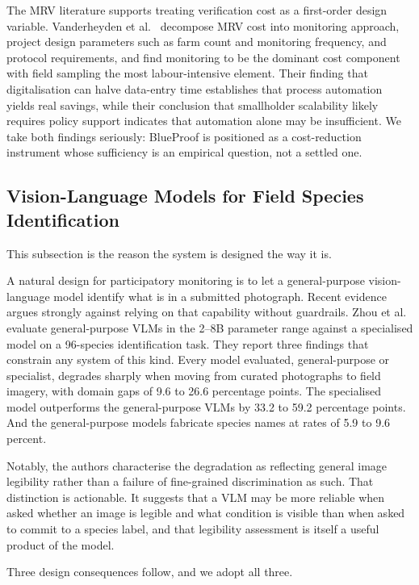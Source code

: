 \documentclass[10pt,twocolumn,a4paper]{article}
\begin{document}
The MRV literature supports treating verification cost as a first-order design
variable. Vanderheyden et al.~\cite{vanderheyden2026} decompose MRV cost into
monitoring approach, project design parameters such as farm count and monitoring
frequency, and protocol requirements, and find monitoring to be the dominant
cost component with field sampling the most labour-intensive element. Their
finding that digitalisation can halve data-entry time establishes that process
automation yields real savings, while their conclusion that smallholder
scalability likely requires policy support indicates that automation alone may
be insufficient. We take both findings seriously: BlueProof is positioned as a
cost-reduction instrument whose sufficiency is an empirical question, not a
settled one.

\subsection{Vision-Language Models for Field Species Identification}
\label{sec:vlmrelated}

This subsection is the reason the system is designed the way it is.

A natural design for participatory monitoring is to let a general-purpose
vision-language model identify what is in a submitted photograph. Recent
evidence argues strongly against relying on that capability without guardrails.
Zhou et al.~\cite{zhou2026} evaluate general-purpose VLMs in the 2--8B parameter
range against a specialised model on a 96-species identification task. They
report three findings that constrain any system of this kind. Every model
evaluated, general-purpose or specialist, degrades sharply when moving from
curated photographs to field imagery, with domain gaps of 9.6 to 26.6 percentage
points. The specialised model outperforms the general-purpose VLMs by 33.2 to
59.2 percentage points. And the general-purpose models fabricate species names
at rates of 5.9 to 9.6 percent.

Notably, the authors characterise the degradation as reflecting general image
legibility rather than a failure of fine-grained discrimination as such. That
distinction is actionable. It suggests that a VLM may be more reliable when
asked whether an image is legible and what condition is visible than when asked
to commit to a species label, and that legibility assessment is itself a useful
product of the model.

Three design consequences follow, and we adopt all three.
\end{document}
